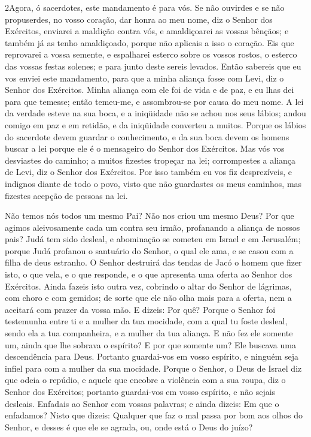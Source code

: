 \lettrine{2} Agora, ó sacerdotes, este mandamento é para vós.
Se não ouvirdes e se não propuserdes, no vosso coração, dar
honra ao meu nome, diz o Senhor dos Exércitos, enviarei a maldição
contra vós, e amaldiçoarei as vossas bênçãos; e também já as tenho
amaldiçoado, porque não aplicais a isso o coração. Eis que
reprovarei a vossa semente, e espalharei esterco sobre os vossos
rostos, o esterco das vossas festas solenes; e para junto deste
sereis levados. Então sabereis que eu vos enviei este
mandamento, para que a minha aliança fosse com Levi, diz o Senhor
dos Exércitos. Minha aliança com ele foi de vida e de paz, e eu
lhas dei para que temesse; então temeu-me, e assombrou-se por causa
do meu nome. A lei da verdade esteve na sua boca, e a iniqüidade
não se achou nos seus lábios; andou comigo em paz e em retidão, e da
iniqüidade converteu a muitos. Porque os lábios do sacerdote
devem guardar o conhecimento, e da sua boca devem os homens buscar a
lei porque ele é o mensageiro do Senhor dos Exércitos. Mas vós
vos desviastes do caminho; a muitos fizestes tropeçar na lei;
corrompestes a aliança de Levi, diz o Senhor dos Exércitos. Por
isso também eu vos fiz desprezíveis, e indignos diante de todo o
povo, visto que não guardastes os meus caminhos, mas fizestes
acepção de pessoas na lei.

Não temos nós todos um mesmo Pai? Não nos criou um mesmo Deus?
Por que agimos aleivosamente cada um contra seu irmão, profanando a
aliança de nossos pais? Judá tem sido desleal, e abominação
se cometeu em Israel e em Jerusalém; porque Judá profanou o
santuário do Senhor, o qual ele ama, e se casou com a filha de deus
estranho. O Senhor destruirá das tendas de Jacó o homem que
fizer isto, o que vela, e o que responde, e o que apresenta uma
oferta ao Senhor dos Exércitos. Ainda fazeis isto outra vez,
cobrindo o altar do Senhor de lágrimas, com choro e com gemidos; de
sorte que ele não olha mais para a oferta, nem a aceitará com prazer
da vossa mão. E dizeis: Por quê? Porque o Senhor foi
testemunha entre ti e a mulher da tua mocidade, com a qual tu foste
desleal, sendo ela a tua companheira, e a mulher da tua aliança.
E não fez ele somente um, ainda que lhe sobrava o espírito? E
por que somente um? Ele buscava uma descendência para Deus. Portanto
guardai-vos em vosso espírito, e ninguém seja infiel para com a
mulher da sua mocidade. Porque o Senhor, o Deus de Israel diz
que odeia o repúdio, e aquele que encobre a violência com a sua
roupa, diz o Senhor dos Exércitos; portanto guardai-vos em vosso
espírito, e não sejais desleais. Enfadais ao Senhor com
vossas palavras; e ainda dizeis: Em que o enfadamos? Nisto que
dizeis: Qualquer que faz o mal passa por bom aos olhos do Senhor, e
desses é que ele se agrada, ou, onde está o Deus do juízo?

